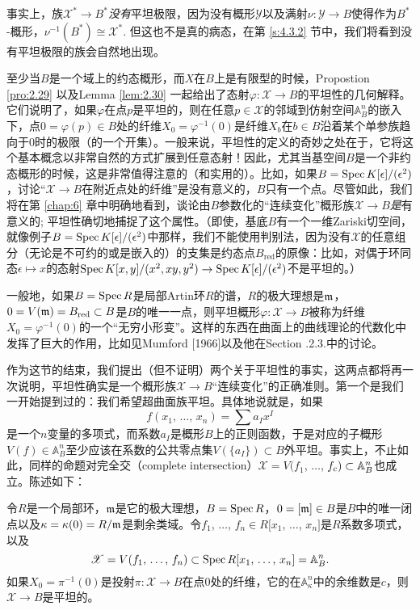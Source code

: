 事实上，族$\mathscr{X}^*\to B^*$\textit{没有}平坦极限，因为没有概形$\mathscr{Y}$以及满射$\nu:\mathscr{Y}\to B$使得作为$B^*$\hyp 概形，$\nu^{-1}(B^*)\cong \mathscr{X}^*$. 但这也不是真的病态，在第 \ref{s:4.3.2} 节中，我们将看到没有平坦极限的族会自然地出现。

至少当$B$是一个域上的约态概形，而$X$在$B$上是有限型的时候，Propostion \ref{pro:2.29} 以及Lemma \ref{lem:2.30} 一起给出了态射$\varphi:\mathscr{X}\to B$的平坦性的几何解释。它们说明了，如果$\varphi$在点$p$是平坦的，则在任意$p\in\mathscr{X}$的邻域到仿射空间$\mathbb{A}_B^n$的嵌入下，点$0=\varphi(p)\in B$处的纤维$X_0=\varphi^{-1}(0)$是纤维$X_b$在$b\in B$沿着某个单参族趋向于$0$时的极限（的一个开集）。一般来说，平坦性的定义的奇妙之处在于，它将这个基本概念以非常自然的方式扩展到任意态射！因此，尤其当基空间$B$是一个非约态概形的时候，这是非常值得注意的（和实用的）。比如，如果$B=\operatorname{Spec} K[\epsilon]/(\epsilon^2)$，讨论“$\mathscr{X}\to B$在附近点处的纤维”是没有意义的，$B$只有一个点。尽管如此，我们将在第 \ref{chap:6} 章中明确地看到，谈论由$B$参数化的“连续变化”概形族$\mathscr{X}\to B$\textit{是}有意义的; 平坦性确切地捕捉了这个属性。（即使，基底$B$有一个一维Zariski切空间，就像例子$B=\operatorname{Spec} K[\epsilon]/(\epsilon^2)$中那样，我们不能使用判别法，因为没有$\mathscr{X}$的任意组分（无论是不可约的或是嵌入的）的支集是约态点$B_{\text{red}}$的原像：比如，对偶于环同态$\epsilon\mapsto x$的态射$\operatorname{Spec} K[x,y]/(x^2,xy,y^2)\to \operatorname{Spec} K[\epsilon]/(\epsilon^2)$不是平坦的。）

一般地，如果$B=\operatorname{Spec} R$是局部Artin环$R$的谱，$R$的极大理想是$\mathfrak{m}$，$0=V(\mathfrak{m})=B_{\text{red}}\subset B$是$B$的唯一一点，则平坦概形$\varphi:\mathscr{X}\to B$被称为纤维$X_0=\varphi^{-1}(0)$的一个“无穷小形变”。这样的东西在曲面上的曲线理论的代数化中发挥了巨大的作用，比如见Mumford [1966]以及他在Section \uppercase\expandafter{}.2.3.中的讨论。

作为这节的结束，我们提出（但不证明）两个关于平坦性的事实，这两点都将再一次说明，平坦性确实是一个概形族$\mathscr{X}\to B$“连续变化”的正确准则。第一个是我们一开始提到过的：我们希望超曲面族平坦。具体地说就是，如果
\[
	f(\text{$x_1$, $\dots$, $x_n$})=\sum a_I x^I
\]
是一个$n$变量的多项式，而系数$a_I$是概形$B$上的正则函数，于是对应的子概形$V(f)\in \mathbb{A}_B^n$至少应该在系数的公共零点集$V(\{a_I\})\subset B$外平坦。事实上，不止如此，同样的命题对完全交（complete intersection）$\mathscr{X}=V(f_1$, $\dots$, $f_c)\subset \mathbb{A}_B^n$也成立。陈述如下：

\begin{pro}
	令$R$是一个局部环，$\mathfrak{m}$是它的极大理想，$B=\operatorname{Spec} R$，$0=[\mathfrak{m}]\in B$是$B$中的唯一闭点以及$\kappa=\kappa(0)=R/\mathfrak{m}$是剩余类域。令$f_1$, $\dots$, $f_n\in R[x_1$, $\dots$, $x_n]$是$R$系数多项式，以及
	\[
	\mathscr{X}=V(\text{$f_1$, $\dots$, $f_n$})\subset \operatorname{Spec} R[\text{$x_1$, $\dots$, $x_n$}]=\mathbb{A}_{B}^n.
	\]
	如果$X_0=\pi^{-1}(0)$是投射$\pi:\mathscr{X}\to B$在点$0$处的纤维，它的在$\mathbb{A}_{\kappa}^n$中的余维数是$c$，则$\mathscr{X}\to B$是平坦的。
\end{pro}

